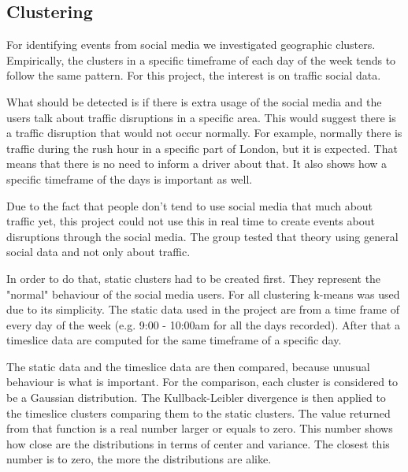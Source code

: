 \subsection{Clustering}

For identifying events from social media we investigated geographic clusters.
Empirically, the clusters in a specific timeframe of each day of
the week tends to follow the same pattern. For this project, the interest is on
traffic social data.

What should be detected is if there is extra usage of the social media and the users talk about
traffic disruptions in a specific area. This would suggest there is a traffic
disruption that would not occur normally. For example, normally there is traffic during
the rush hour in a specific part of London, but it is expected. That means that
there is no need to inform a driver about that. It also shows how a specific
timeframe of the days is important as well.

Due to the fact that people don't tend to use social media that much about
traffic yet, this project could not use this in real time to create events
about disruptions through the social media. The group
tested that theory using general social data and not only about traffic.

In order to do that, static clusters had to be created first.
They represent the "normal" behaviour of the social media users. For all clustering
k-means\cite{website:k-means} was used due to its simplicity. The static data used in the project are
from a time frame of every day of the week (e.g. 9:00 - 10:00am for all the
days recorded). After that a timeslice data are computed for the same timeframe
of a specific day.

The static data and the timeslice data are then compared, because unusual
behaviour is what is important. For the comparison, each cluster is considered
to be a Gaussian distribution\cite{website:gaussian}. The Kullback-Leibler
divergence\cite{Kullback} is then applied to the timeslice clusters comparing
them to the static clusters. The value returned from that function is a real
number larger or equals to zero. This number shows how close are the
distributions in terms of center and variance. The closest this number is to
zero, the more the distributions are alike.

